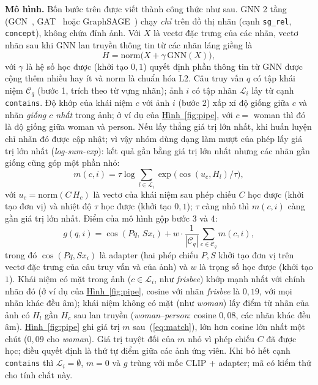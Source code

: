 \documentclass[conference]{IEEEtran}
\begin{document}
\textbf{Mô hình.} Bốn bước trên được viết thành công thức như sau. GNN 2 tầng (GCN~\cite{gcn}, GAT~\cite{gat} hoặc GraphSAGE~\cite{sage}) chạy \emph{chỉ} trên đồ thị nhãn (cạnh \texttt{sg\_rel}, \texttt{concept}), không chứa đỉnh ảnh. Với $X$ là vectơ đặc trưng của các nhãn, vectơ nhãn sau khi GNN lan truyền thông tin từ các nhãn láng giềng là
\begin{equation}\label{eq:H}
H=\mathrm{norm}\big(X+\gamma\,\mathrm{GNN}(X)\big),
\end{equation}
với $\gamma$ là hệ số học được (khởi tạo $0{,}1$) quyết định phần thông tin từ GNN được cộng thêm nhiều hay ít và $\mathrm{norm}$ là chuẩn hóa L2. Câu truy vấn $q$ có tập khái niệm $\mathcal C_q$ (bước 1, trích theo từ vựng nhãn); ảnh $i$ có tập nhãn $\mathcal L_i$ lấy từ cạnh \texttt{contains}. Độ khớp của khái niệm $c$ với ảnh $i$ (bước 2) xấp xỉ độ giống giữa $c$ và nhãn \emph{giống $c$ nhất} trong ảnh; ở ví dụ của \hyperref[fig:pipe]{Hình~\ref*{fig:pipe}}, với $c=$ woman thì đó là độ giống giữa woman và person. Nếu lấy thẳng giá trị lớn nhất, khi huấn luyện chỉ nhãn đó được cập nhật; vì vậy nhóm dùng dạng làm mượt của phép lấy giá trị lớn nhất (\emph{log-sum-exp}): kết quả gần bằng giá trị lớn nhất nhưng các nhãn gần giống cũng góp một phần nhỏ:
\begin{equation}\label{eq:match}
m(c,i)=\tau\log\sum_{l\in\mathcal L_i}\exp\!\big(\cos(u_c,H_l)/\tau\big),
\end{equation}
với $u_c=\mathrm{norm}(C\,H_c)$ là vectơ của khái niệm sau phép chiếu $C$ học được (khởi tạo đơn vị) và nhiệt độ $\tau$ học được (khởi tạo $0{,}1$); $\tau$ càng nhỏ thì $m(c,i)$ càng gần giá trị lớn nhất. Điểm của mô hình gộp bước 3 và 4:
\begin{equation}\label{eq:qa}
g(q,i)=\cos(Pq,\,Sx_i)+w\cdot\frac{1}{|\mathcal C_q|}\sum_{c\in\mathcal C_q}m(c,i),
\end{equation}
trong đó $\cos(Pq,Sx_i)$ là adapter (hai phép chiếu $P,S$ khởi tạo đơn vị trên vectơ đặc trưng của câu truy vấn và của ảnh) và $w$ là trọng số học được (khởi tạo $1$). Khái niệm có mặt trong ảnh ($c\in\mathcal L_i$, như \emph{frisbee}) khớp mạnh nhất với chính nhãn đó (ở ví dụ của \hyperref[fig:pipe]{Hình~\ref*{fig:pipe}}, cosine với nhãn \emph{frisbee} là $0{,}19$, với mọi nhãn khác đều âm); khái niệm không có mặt (như \emph{woman}) lấy điểm từ nhãn của ảnh có $H_l$ gần $H_c$ sau lan truyền (\emph{woman}--\emph{person}: cosine $0{,}08$, các nhãn khác đều âm). \hyperref[fig:pipe]{Hình~\ref*{fig:pipe}} ghi giá trị $m$ sau~(\ref{eq:match}), lớn hơn cosine lớn nhất một chút ($0{,}09$ cho \emph{woman}). Giá trị tuyệt đối của $m$ nhỏ vì phép chiếu $C$ đã được học; điều quyết định là thứ tự điểm giữa các ảnh ứng viên. Khi bỏ hết cạnh \texttt{contains} thì $\mathcal L_i=\emptyset$, $m=0$ và $g$ trùng với mốc CLIP + adapter; mã có kiểm thử cho tính chất này.
\end{document}

